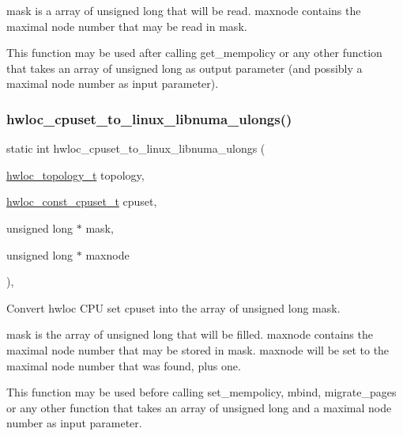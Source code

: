 {\ttfamily mask} is a array of unsigned long that will be read. {\ttfamily maxnode} contains the maximal node number that may be read in {\ttfamily mask}.

This function may be used after calling get\+\_\+mempolicy or any other function that takes an array of unsigned long as output parameter (and possibly a maximal node number as input parameter). \mbox{\label{a00215_gae577962390f84b0b12f503314ab0f972}} 
\subsubsection{\texorpdfstring{hwloc\+\_\+cpuset\+\_\+to\+\_\+linux\+\_\+libnuma\+\_\+ulongs()}{hwloc\_cpuset\_to\_linux\_libnuma\_ulongs()}}
{\footnotesize\ttfamily static int hwloc\+\_\+cpuset\+\_\+to\+\_\+linux\+\_\+libnuma\+\_\+ulongs (\begin{DoxyParamCaption}\item[{\hyperlink{a00186_ga9d1e76ee15a7dee158b786c30b6a6e38}{hwloc\+\_\+topology\+\_\+t}}]{topology,  }\item[{\hyperlink{a00183_ga1f784433e9b606261f62d1134f6a3b25}{hwloc\+\_\+const\+\_\+cpuset\+\_\+t}}]{cpuset,  }\item[{unsigned long $\ast$}]{mask,  }\item[{unsigned long $\ast$}]{maxnode }\end{DoxyParamCaption})\hspace{0.3cm}{\ttfamily [inline]}, {\ttfamily [static]}}



Convert hwloc C\+PU set {\ttfamily cpuset} into the array of unsigned long {\ttfamily mask}. 

{\ttfamily mask} is the array of unsigned long that will be filled. {\ttfamily maxnode} contains the maximal node number that may be stored in {\ttfamily mask}. {\ttfamily maxnode} will be set to the maximal node number that was found, plus one.

This function may be used before calling set\+\_\+mempolicy, mbind, migrate\+\_\+pages or any other function that takes an array of unsigned long and a maximal node number as input parameter. \mbox{\label{a00215_gad8491c672eb2594cc5e7b0a026867192}} 

